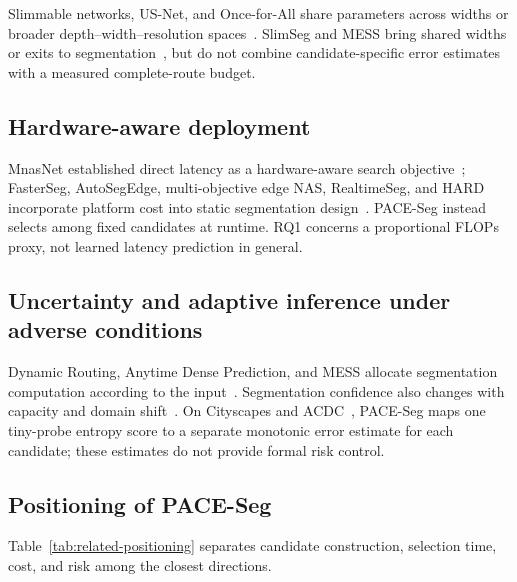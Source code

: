 \documentclass[a4paper,review,12pt]{elsarticle}
\newcommand{\method}{PACE-Seg}
\begin{document}
Slimmable networks, US-Net, and Once-for-All share parameters across widths or broader depth--width--resolution spaces~\cite{yu2019slimmable,yu2019usnet,cai2020ofa}. SlimSeg and MESS bring shared widths or exits to segmentation~\cite{xue2022slimseg,kouris2022mess}, but do not combine candidate-specific error estimates with a measured complete-route budget.

\subsection{Hardware-aware deployment}

MnasNet established direct latency as a hardware-aware search objective~\cite{tan2019mnasnet}; FasterSeg, AutoSegEdge, multi-objective edge NAS, RealtimeSeg, and HARD incorporate platform cost into static segmentation design~\cite{chen2020fasterseg,dou2023autosegedge,dou2024multiobjective,li2023realtimeseg,kwon2024hard}. \method{} instead selects among fixed candidates at runtime. RQ1 concerns a proportional FLOPs proxy, not learned latency prediction in general.

\subsection{Uncertainty and adaptive inference under adverse conditions}

Dynamic Routing, Anytime Dense Prediction, and MESS allocate segmentation computation according to the input~\cite{li2020dynamic,liu2022anytime,kouris2022mess}. Segmentation confidence also changes with capacity and domain shift~\cite{wang2023calibrating,dejorge2023reliability}. On Cityscapes and ACDC~\cite{sakaridis2021acdc}, \method{} maps one tiny-probe entropy score to a separate monotonic error estimate for each candidate; these estimates do not provide formal risk control.

\subsection{Positioning of PACE-Seg}

Table~\ref{tab:related-positioning} separates candidate construction, selection time, cost, and risk among the closest directions.
\end{document}
